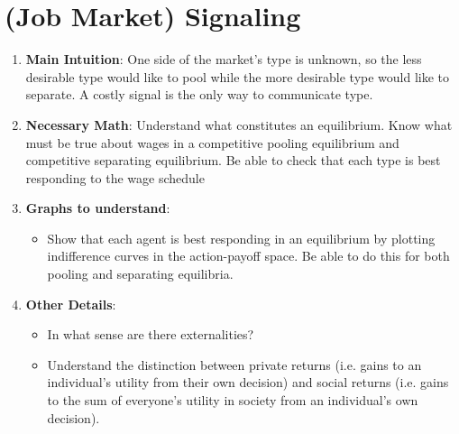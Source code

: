 \documentclass[letter,12pt]{article}
\begin{document}
\section{(Job Market) Signaling}
\begin{enumerate}
	\item \textbf{Main Intuition}: One side of the market's type is unknown, so the less desirable type would like to pool while the more desirable type would like to separate. A costly signal is the only way to communicate type. 
	\item \textbf{Necessary Math}: Understand what constitutes an equilibrium. Know what must be true about wages in a competitive pooling equilibrium and competitive separating equilibrium. Be able to check that each type is best responding to the wage schedule
	\item \textbf{Graphs to understand}: 
	\begin{itemize}
		\item Show that each agent is best responding in an equilibrium by plotting indifference curves in the action-payoff space. Be able to do this for both pooling and separating equilibria.
	\end{itemize}
	\item \textbf{Other Details}:
	\begin{itemize}
		\item In what sense are there externalities?
		\item Understand the distinction between private returns (i.e. gains to an individual's utility from their own decision) and social returns (i.e. gains to the sum of everyone's utility in society from an individual's own decision).
	\end{itemize} 
\end{enumerate}
\end{document}
